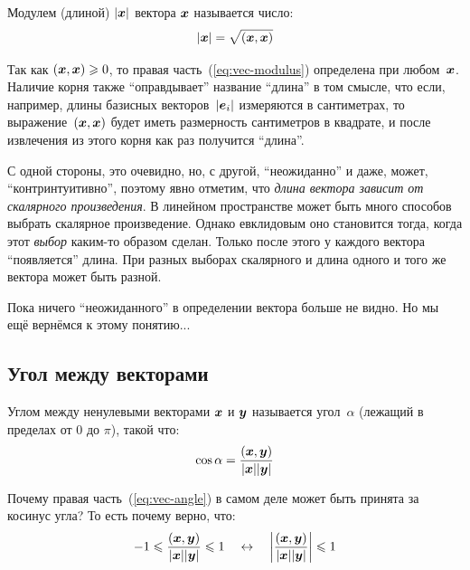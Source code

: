 \documentclass[a4paper,12pt]{article}
\begin{document}
  \begin{definition}
    Модулем (длиной) $|\boldsymbol x|$ вектора $\boldsymbol x$ называется число:
    \begin{equation}\label{eq:vec-modulus}
      |\boldsymbol x| = \sqrt{(\boldsymbol x, \boldsymbol x)}
    \end{equation}
  \end{definition}
  
  Так как $(\bds x, \bds x) \hm\geq 0$, то правая часть~(\ref{eq:vec-modulus}) определена при любом~$\boldsymbol x$.
  Наличие корня также ``оправдывает'' название ``длина'' в том смысле, что если, например, длины базисных векторов~$|\boldsymbol e_i|$ измеряются в сантиметрах, то выражение~$(\boldsymbol x, \boldsymbol x)$ будет иметь размерность сантиметров в квадрате, и после извлечения из этого корня как раз получится ``длина''.
  
  С одной стороны, это очевидно, но, с другой, ``неожиданно'' и даже, может, ``контринтуитивно'', поэтому явно отметим, что \emph{длина вектора зависит от скалярного произведения}.
  В линейном пространстве может быть много способов выбрать скалярное произведение.
  Однако евклидовым оно становится тогда, когда этот \emph{выбор} каким-то образом сделан.
  Только после этого у каждого вектора ``появляется'' длина.
  При разных выборах скалярного и длина одного и того же вектора может быть разной.
  
  Пока ничего ``неожиданного'' в определении вектора больше не видно.
  Но мы ещё вернёмся к этому понятию...
  
  
  \subsection{Угол между векторами}
  
  \begin{definition}
    Углом между ненулевыми векторами $\boldsymbol x$ и $\boldsymbol y$ называется угол~$\alpha$ (лежащий в пределах от $0$ до $\pi$), такой что:
    \begin{equation}\label{eq:vec-angle}
      \cos\alpha = \frac{(\boldsymbol x, \boldsymbol y)}{|\boldsymbol x| |\boldsymbol y|}
    \end{equation}
  \end{definition}
  
  Почему правая часть~(\ref{eq:vec-angle}) в самом деле может быть принята за косинус угла?
  То есть почему верно, что:
  \[
    -1 \leqslant \frac{(\boldsymbol x, \boldsymbol y)}{|\boldsymbol x| |\boldsymbol y|} \leqslant 1
    \quad\leftrightarrow\quad \left|\frac{(\boldsymbol x, \boldsymbol y)}{|\boldsymbol x| |\boldsymbol y|}\right| \leqslant 1
  \]
  
\end{document}

